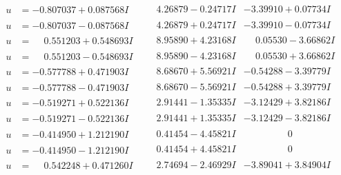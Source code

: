 \documentclass[1p]{elsarticle_modified}
\theoremstyle{definition}
\begin{document}
$$\begin{array}{c|c|c}
\begin{aligned}
u &= -0.807037 + 0.087568 I\end{aligned}
 & \phantom{-}4.26879 - 0.24717 I & -3.39910 + 0.07734 I \\ \hline\begin{aligned}
u &= -0.807037 - 0.087568 I\end{aligned}
 & \phantom{-}4.26879 + 0.24717 I & -3.39910 - 0.07734 I \\ \hline\begin{aligned}
u &= \phantom{-}0.551203 + 0.548693 I\end{aligned}
 & \phantom{-}8.95890 + 4.23168 I & \phantom{-}0.05530 - 3.66862 I \\ \hline\begin{aligned}
u &= \phantom{-}0.551203 - 0.548693 I\end{aligned}
 & \phantom{-}8.95890 - 4.23168 I & \phantom{-}0.05530 + 3.66862 I \\ \hline\begin{aligned}
u &= -0.577788 + 0.471903 I\end{aligned}
 & \phantom{-}8.68670 + 5.56921 I & -0.54288 - 3.39779 I \\ \hline\begin{aligned}
u &= -0.577788 - 0.471903 I\end{aligned}
 & \phantom{-}8.68670 - 5.56921 I & -0.54288 + 3.39779 I \\ \hline\begin{aligned}
u &= -0.519271 + 0.522136 I\end{aligned}
 & \phantom{-}2.91441 - 1.35335 I & -3.12429 + 3.82186 I \\ \hline\begin{aligned}
u &= -0.519271 - 0.522136 I\end{aligned}
 & \phantom{-}2.91441 + 1.35335 I & -3.12429 - 3.82186 I \\ \hline\begin{aligned}
u &= -0.414950 + 1.212190 I\end{aligned}
 & \phantom{-}0.41454 - 4.45821 I & \phantom{-0.000000 } 0 \\ \hline\begin{aligned}
u &= -0.414950 - 1.212190 I\end{aligned}
 & \phantom{-}0.41454 + 4.45821 I & \phantom{-0.000000 } 0 \\ \hline\begin{aligned}
u &= \phantom{-}0.542248 + 0.471260 I\end{aligned}
 & \phantom{-}2.74694 - 2.46929 I & -3.89041 + 3.84904 I \\ \hline\begin{aligned}

\end{aligned}
\end{array}$$
\end{document}
